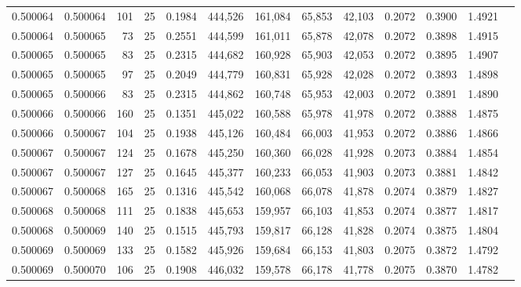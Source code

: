 \begin{tabular}{rrrrrrrrrrrrr}
0.500064 & 0.500064 & 101 &  25 &                                     0.1984 & 444,526 & 161,084 &  65,853 &  42,103 & 0.2072 & 0.3900 & 1.4921 \\
0.500064 & 0.500065 &  73 &  25 &                                     0.2551 & 444,599 & 161,011 &  65,878 &  42,078 & 0.2072 & 0.3898 & 1.4915 \\
0.500065 & 0.500065 &  83 &  25 &                                     0.2315 & 444,682 & 160,928 &  65,903 &  42,053 & 0.2072 & 0.3895 & 1.4907 \\
0.500065 & 0.500065 &  97 &  25 &                                     0.2049 & 444,779 & 160,831 &  65,928 &  42,028 & 0.2072 & 0.3893 & 1.4898 \\
0.500065 & 0.500066 &  83 &  25 &                                     0.2315 & 444,862 & 160,748 &  65,953 &  42,003 & 0.2072 & 0.3891 & 1.4890 \\
0.500066 & 0.500066 & 160 &  25 &                                     0.1351 & 445,022 & 160,588 &  65,978 &  41,978 & 0.2072 & 0.3888 & 1.4875 \\
0.500066 & 0.500067 & 104 &  25 &                                     0.1938 & 445,126 & 160,484 &  66,003 &  41,953 & 0.2072 & 0.3886 & 1.4866 \\
0.500067 & 0.500067 & 124 &  25 &                                     0.1678 & 445,250 & 160,360 &  66,028 &  41,928 & 0.2073 & 0.3884 & 1.4854 \\
0.500067 & 0.500067 & 127 &  25 &                                     0.1645 & 445,377 & 160,233 &  66,053 &  41,903 & 0.2073 & 0.3881 & 1.4842 \\
0.500067 & 0.500068 & 165 &  25 &                                     0.1316 & 445,542 & 160,068 &  66,078 &  41,878 & 0.2074 & 0.3879 & 1.4827 \\
0.500068 & 0.500068 & 111 &  25 &                                     0.1838 & 445,653 & 159,957 &  66,103 &  41,853 & 0.2074 & 0.3877 & 1.4817 \\
0.500068 & 0.500069 & 140 &  25 &                                     0.1515 & 445,793 & 159,817 &  66,128 &  41,828 & 0.2074 & 0.3875 & 1.4804 \\
0.500069 & 0.500069 & 133 &  25 &                                     0.1582 & 445,926 & 159,684 &  66,153 &  41,803 & 0.2075 & 0.3872 & 1.4792 \\
0.500069 & 0.500070 & 106 &  25 &                                     0.1908 & 446,032 & 159,578 &  66,178 &  41,778 & 0.2075 & 0.3870 & 1.4782 \\

\end{tabular}
